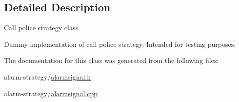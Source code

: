 \subsection{Detailed Description}
Call police strategy class. 

Dummy implementation of call police strategy. Intended for testing purposes. 

The documentation for this class was generated from the following files\+:\begin{DoxyCompactItemize}
\item 
alarm-\/strategy/\hyperlink{alarmsignal_8h}{alarmsignal.\+h}\item 
alarm-\/strategy/\hyperlink{alarmsignal_8cpp}{alarmsignal.\+cpp}\end{DoxyCompactItemize}
